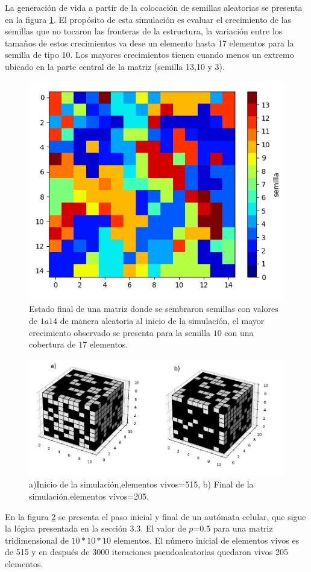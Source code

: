 \documentclass{article}
\begin{document}
La generación de vida a partir de la colocación de semillas aleatorias se presenta en la figura \ref{semillas}. El propósito de esta simulación es evaluar el crecimiento de las semillas que no tocaron las fronteras de la estructura, la variación entre los tamaños de estos crecimientos va dese un elemento hasta 17 elementos para la semilla de tipo 10. Los mayores crecimientos tienen cuando menos un extremo ubicado en la parte central de la matriz (semilla 13,10 y 3). 
\begin{figure} 
    \centering
    \includegraphics[width=140mm]{semillas.png} 
    \caption{Estado final de una matriz donde se sembraron semillas con valores de $1 a 14$ de manera aleatoria al inicio de la simulación, el mayor crecimiento observado se presenta para la semilla $10$ con una cobertura de $17$ elementos.}
    \label{semillas}
\end{figure}

\begin{figure}[] 
    \centering
    \includegraphics[width=140mm]{3d.png} 
    \caption{a)Inicio de la simulación,elementos vivos=515, b) Final de la simulación,elementos vivos=205.}
    \label{3d}
\end{figure}
En la figura \ref{3d} se presenta el paso inicial y final de un autómata celular, que sigue la lógica presentada en la sección 3.3. El valor de $p$=$0.5$ para una matriz tridimensional de $10*10*10$ elementos. El número inicial de elementos vivos es de 515 y en después de 3000 iteraciones pseudoaleatorias quedaron vivos 205 elementos. 
\end{document}
